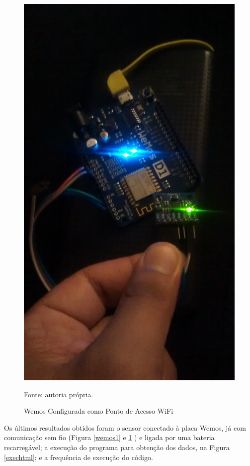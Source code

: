 	\begin{figure}[h]
		\centering
		\includegraphics[keepaspectratio=true,scale=0.075]{figuras/wemos2.jpg}
		\caption{Wemos Configurada como Ponto de Acesso WiFi}
		\footnotesize Fonte: autoria própria. 
		\label{wemos2}	
	\end{figure}
	
	Os últimos resultados obtidos foram o sensor conectado à placa Wemos, já com comunicação sem fio (Figura \ref{wemos1} e \ref{wemos2} ) e ligada por uma bateria recarregável; a execução do programa para obtenção dos dados, na Figura \ref{exechtml}; e a frequência de execução do código.
	
